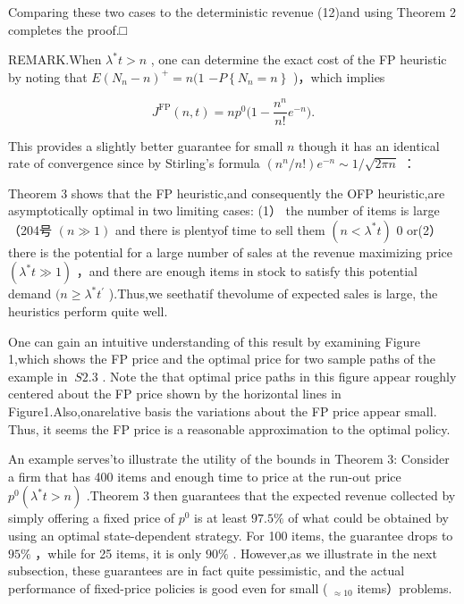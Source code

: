 Comparing these two cases to the deterministic revenue (12)and using
Theorem 2 completes the proof.□

REMARK.When \(\lambda ^ { * } t > n\) , one can determine the exact cost
of the FP heuristic by noting that
\(E ( N _ { n } - n ) ^ { + } = n ( 1\)
\(- \left. P \left\{ N _ { n } = n \right\} \right.\) )，which implies

\[
J ^ { \mathrm { F P } } ( n , t ) = n p ^ { 0 } \bigg ( 1 - \frac { n ^ { n } } { n ! } e ^ { - n } \bigg ) .
\]

This provides a slightly better guarantee for small \(n\) though it has
an identical rate of convergence since by Stirling's formula
\(( n ^ { n } / n ! ) e ^ { - n } \sim 1 / \sqrt { 2 \pi n }\) ：

Theorem 3 shows that the FP heuristic,and consequently the OFP
heuristic,are asymptotically optimal in two limiting cases: (1） the
number of items is large （204号 \(( n \gg 1 )\) and there is plentyof
time to sell them \(( n < \lambda ^ { * } t )\) 0 or(2） there is the
potential for a large number of sales at the revenue maximizing price
\(( \lambda ^ { * } t \gg 1 )\) ，and there are enough items in stock to
satisfy this potential demand
\(( n \geq \lambda ^ { * } t ^ { \prime }\) ).Thus,we seethatif
thevolume of expected sales is large, the heuristics perform quite well.

One can gain an intuitive understanding of this result by examining
Figure 1,which shows the FP price and the optimal price for two sample
paths of the example in \(\ S 2 . 3\) . Note the that optimal price
paths in this figure appear roughly centered about the FP price shown by
the horizontal lines in Figure1.Also,onarelative basis the variations
about the FP price appear small. Thus, it seems the FP price is a
reasonable approximation to the optimal policy.

An example serves'to illustrate the utility of the bounds in Theorem 3:
Consider a firm that has 400 items and enough time to price at the
run-out price \(p ^ { 0 } ( \lambda ^ { * } t > n )\) .Theorem 3 then
guarantees that the expected revenue collected by simply offering a
fixed price of \(p ^ { 0 }\) is at least \(9 7 . 5 \%\) of what could be
obtained by using an optimal state-dependent strategy. For 100 items,
the guarantee drops to \(9 5 \%\) ，while for 25 items, it is only
\(9 0 \%\) . However,as we illustrate in the next subsection, these
guarantees are in fact quite pessimistic, and the actual performance of
fixed-price policies is good even for small ( \(_ { \approx 1 0 }\)
items）problems.


